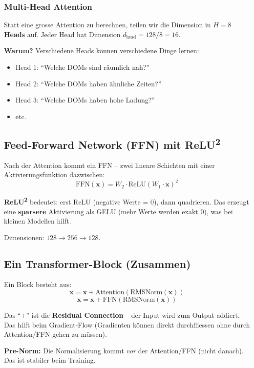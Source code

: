 \documentclass[12pt, a4paper]{article}
\begin{document}
\subsubsection{Multi-Head Attention}

Statt eine grosse Attention zu berechnen, teilen wir die Dimension in
$H = 8$ \textbf{Heads} auf. Jeder Head hat Dimension $d_\text{head} = 128/8 = 16$.

\textbf{Warum?} Verschiedene Heads k\"onnen verschiedene Dinge lernen:
\begin{itemize}
    \item Head 1: ``Welche DOMs sind r\"aumlich nah?''
    \item Head 2: ``Welche DOMs haben \"ahnliche Zeiten?''
    \item Head 3: ``Welche DOMs haben hohe Ladung?''
    \item etc.
\end{itemize}

\subsection{Feed-Forward Network (FFN) mit ReLU\textsuperscript{2}}

Nach der Attention kommt ein FFN -- zwei lineare Schichten mit einer
Aktivierungsfunktion dazwischen:
\[
    \text{FFN}(\mathbf{x}) = W_2 \cdot \text{ReLU}(W_1 \cdot \mathbf{x})^2
\]

\textbf{ReLU\textsuperscript{2}} bedeutet: erst ReLU (negative Werte = 0),
dann quadrieren. Das erzeugt eine \textbf{sparsere} Aktivierung als GELU
(mehr Werte werden exakt 0), was bei kleinen Modellen hilft.

Dimensionen: $128 \to 256 \to 128$.

\subsection{Ein Transformer-Block (Zusammen)}

Ein Block besteht aus:
\[
    \mathbf{x} = \mathbf{x} + \text{Attention}(\text{RMSNorm}(\mathbf{x}))
\]
\[
    \mathbf{x} = \mathbf{x} + \text{FFN}(\text{RMSNorm}(\mathbf{x}))
\]

Das ``$+$'' ist die \textbf{Residual Connection} -- der Input wird zum
Output addiert. Das hilft beim Gradient-Flow (Gradienten k\"onnen direkt
durchfliessen ohne durch Attention/FFN gehen zu m\"ussen).

\textbf{Pre-Norm:} Die Normalisierung kommt \textit{vor} der Attention/FFN
(nicht danach). Das ist stabiler beim Training.
\end{document}
